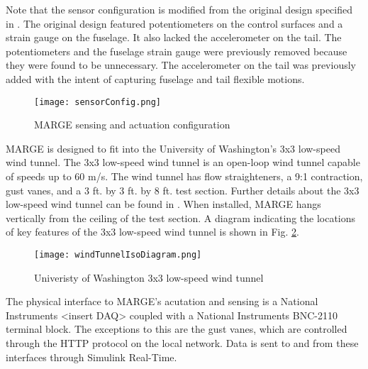 Note that the sensor configuration is modified from the original design specified in \cite{Quenzer2019}. The original design featured potentiometers on the control surfaces and a strain gauge on the fuselage. It also lacked the accelerometer on the tail. The potentiometers and the fuselage strain gauge were previously removed because they were found to be unnecessary. The accelerometer on the tail was previously added with the intent of capturing fuselage and tail flexible motions.
\begin{figure}[h]
    \centering
    \texttt{[image: sensorConfig.png]}
    \caption{MARGE sensing and actuation configuration}
    \label{fig:sensorConfig}
\end{figure}

MARGE is designed to fit into the University of Washington's 3x3 low-speed wind tunnel. The 3x3 low-speed wind tunnel is an open-loop wind tunnel capable of speeds up to 60 m/s. The wind tunnel has flow straighteners, a 9:1 contraction, gust vanes, and a 3 ft. by 3 ft. by 8 ft. test section. Further details about the 3x3 low-speed wind tunnel can be found in \cite{3x3site}. When installed, MARGE hangs vertically from the ceiling of the test section. A diagram indicating the locations of key features of the 3x3 low-speed wind tunnel is shown in Fig. \ref{fig:3x3}.
\begin{figure}[h]
    \centering
    \texttt{[image: windTunnelIsoDiagram.png]}
    \caption{Univeristy of Washington 3x3 low-speed wind tunnel}
    \label{fig:3x3}
\end{figure}

The physical interface to MARGE's acutation and sensing is a National Instruments <insert DAQ> coupled with a National Instruments BNC-2110 terminal block. The exceptions to this are the gust vanes, which are controlled through the HTTP protocol on the local network. Data is sent to and from these interfaces through Simulink Real-Time.